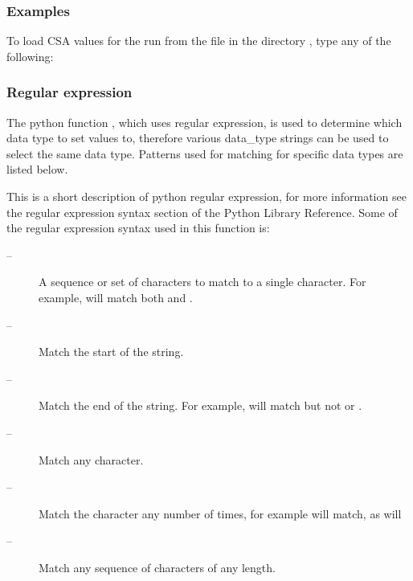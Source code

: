   
 \subsubsection{Examples} 

 To load CSA values for the run  from the file  in the directory , type any of the following: 
  




  
 \subsubsection{Regular expression} 

 The python function , which uses regular expression, is used to determine which data type to set values to, therefore various data\_type strings can be used to select the same data type.  Patterns used for matching for specific data types are listed below. 
  

 This is a short description of python regular expression, for more information see the regular expression syntax section of the Python Library Reference.  Some of the regular expression syntax used in this function is: 
  

 \begin{description} 
 \item[\quotecmd{[]} --]  A sequence or set of characters to match to a single character.  For example,  will match both  and .  
 \item[\quotecmd{\^{}} --]  Match the start of the string.  
 \item[\quotecmd{\$} --]  Match the end of the string.  For example,  will match  but not  or .  
 \item[ --]  Match any character.  
 \item[ --]  Match the character  any number of times, for example  will match, as will   
 \item[ --]  Match any sequence of characters of any length.  
 \end{description} 
  

